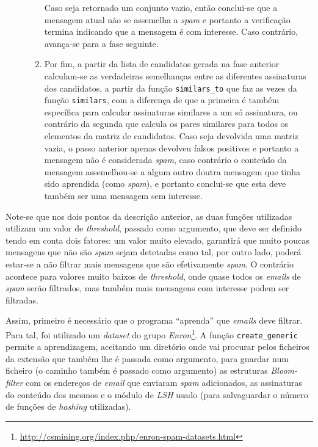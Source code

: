 \documentclass[a4paper,11pt,openright,oneside]{report}
\begin{document}
\begin{description}
\begin{enumerate}
    Caso seja retornado um conjunto vazio, então conclui-se que a mensagem atual não se assemelha a \textit{spam} e portanto a verificação termina indicando que a mensagem é com interesse. Caso contrário, avança-se para a fase seguinte.
  \item Por fim, a partir da lista de candidatos gerada na fase anterior calculam-se as verdadeiras semelhanças entre as diferentes assinaturas dos candidatos, a partir da função \texttt{similars\_to} que faz as vezes da função \texttt{similars}, com a diferença de que a primeira é também específica para calcular assinaturas similares a um só assinatura, ou contrário da segunda que calcula os pares similares para todos os elementos da matriz de candidatos. Caso seja devolvida uma matriz vazia, o passo anterior apenas devolveu falsos positivos e portanto a mensagem não é considerada \textit{spam}, caso contrário o conteúdo da mensagem assemelhou-se a algum outro doutra mensagem que tinha sido aprendida (como \textit{spam}), e portanto conclui-se que esta deve também ser uma mensagem sem interesse.
  \end{enumerate}
\end{description}

Note-se que nos dois pontos da descrição anterior, as duas funções utilizadas utilizam um valor de \textit{threshold}, passado como argumento, que deve ser definido tendo em conta dois fatores: um valor muito elevado, garantirá que muito poucas mensagens que não são \textit{spam} sejam detetadas como tal, por outro lado, poderá estar-se a não filtrar mais mensagens que são efetivamente \textit{spam}. O contrário acontece para valores muito baixos de \textit{threshold}, onde quase todos os \textit{emails} de \textit{spam} serão filtrados, mas também mais mensagens com interesse podem ser filtradas.

Assim, primeiro é necessário que o programa ``aprenda'' que \textit{emails} deve filtrar. Para tal, foi utilizado um \textit{dataset} do grupo \textit{Enron}\footnote{\url{http://csmining.org/index.php/enron-spam-datasets.html}}. A função \texttt{create\_generic} permite a aprendizagem, aceitando um diretório onde vai procurar pelos ficheiros da extensão que também lhe é passada como argumento, para guardar num ficheiro (o caminho também é passado como argumento) as estruturas \textit{Bloom-filter} com os endereços de \textit{email} que enviaram \textit{spam} adicionados, as assinaturas do conteúdo dos mesmos e o módulo de \textit{LSH} usado (para salvaguardar o número de funções de \textit{hashing} utilizadas).
\end{document}
